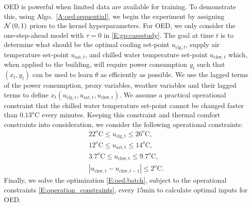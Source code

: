 OED is powerful when limited data are available for training. 
To demonstrate this, using Algo.~\ref{A:oed:sequential}, we begin the experiment by assigning \(\operatorname*{\mathcal{N}}\left(0, 1\right)\) priors to the kernel hyperparameters. %
For OED, we only consider the one-step-ahead model with \(\tau=0\) in \eqref{E:gp:casestudy}.
The goal at time \(t\) is to determine what should be the optimal cooling set-point \(u_{\mathrm{clg},t}\), supply air temperature set-point \(u_{\mathrm{sat},t}\), and chilled water temperature set-point \(u_{\mathrm{chw},t}\) which, when applied to the building, will require power consumption \(y_t\) such that \((x_t,y_t)\) can be used to learn \(\theta\) as efficiently as possible.
We use the lagged terms of the power consumption, proxy variables, weather variables and their lagged terms to define \(x_t(u_{\mathrm{clg,t}},u_{\mathrm{sat,t}},u_{\mathrm{chw,t}})\).
We assume a practical operational constraint that the chilled water temperature set-point cannot be changed faster than \(0.13^o\mathrm{C}\) every minutes.
Keeping this constraint and thermal comfort constraints into consideration, we consider the following operational constraints:
\begin{gather}
22^o\mathrm{C} \leq u_{\mathrm{clg,t}} \leq  26^o\mathrm{C}, \nonumber \\
12^o\mathrm{C} \leq u_{\mathrm{sat,t}} \leq  14^o\mathrm{C}, \nonumber \\
 3.7^o\mathrm{C} \leq u_{\mathrm{chw,t}} \leq  9.7^o\mathrm{C},\label{E:operation_constraints} \\
| u_{\mathrm{chw},t} - u_{\mathrm{chw},t-1}| \leq  2^o\mathrm{C}. \nonumber
\end{gather}
Finally, we solve the optimization \eqref{E:oed:batch}, subject to the operational constraints \eqref{E:operation_constraints}, every \(15 \mathrm{min}\) to calculate optimal inputs for OED.

